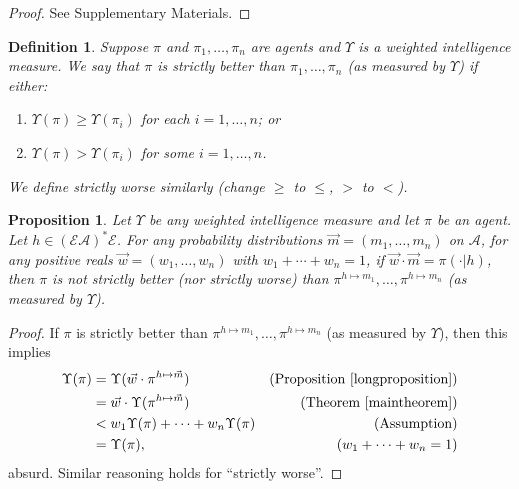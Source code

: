 \documentclass[twoside]{article}
\newtheorem{definition}[theorem]{Definition}
\newtheorem{proposition}[theorem]{Proposition}
\begin{document}
\begin{proof}
    See Supplementary Materials.
\end{proof}

\begin{definition}
    Suppose $\pi$ and $\pi_1,\ldots,\pi_n$ are agents and $\Upsilon$ is a
    weighted intelligence measure. We say that $\pi$ is \emph{strictly better than}
    $\pi_1,\ldots,\pi_n$ (as measured by $\Upsilon$) if either:
    \begin{enumerate}
        \item $\Upsilon(\pi)\geq \Upsilon(\pi_i)$ for each $i=1,\ldots,n$; or
        \item $\Upsilon(\pi)>\Upsilon(\pi_i)$ for some $i=1,\ldots,n$.
    \end{enumerate}
    We define \emph{strictly worse} similarly (change $\geq$ to $\leq$,
    $>$ to $<$).
\end{definition}

\begin{proposition}
\label{pointwisegenericnessthm}
    Let $\Upsilon$ be any weighted intelligence measure and let
    $\pi$ be an agent.
    Let $h\in (\mathcal E\mathcal A)^*\mathcal E$.
    For any probability distributions $\vec m=(m_1,\ldots,m_n)$ on $\mathcal A$,
    for any positive reals $\vec w=(w_1,\ldots,w_n)$ with $w_1+\cdots+w_n=1$,
    if $\vec w\cdot\vec m=\pi(\cdot|h)$,
    then $\pi$ is not strictly better (nor strictly worse) than
    $\pi^{h\mapsto m_1},\ldots,\pi^{h\mapsto m_n}$
    (as measured by $\Upsilon$).
\end{proposition}

\begin{proof}
    If $\pi$ is strictly better than $\pi^{h\mapsto m_1},\ldots,\pi^{h\mapsto m_n}$
    (as measured by $\Upsilon$), then this implies
    \begin{align*}
        \Upsilon(\pi)
            &= \Upsilon(\vec w\cdot\pi^{h\mapsto\vec m})
                &\mbox{(Proposition \ref{longproposition})}\\
            &= \vec w\cdot\Upsilon(\pi^{h\mapsto\vec m})
                &\mbox{(Theorem \ref{maintheorem})}\\
            &< w_1\Upsilon(\pi)+\cdots+w_n\Upsilon(\pi)
                &\mbox{(Assumption)}\\
            &= \Upsilon(\pi),
                &\mbox{($w_1+\cdots+w_n=1$)}
    \end{align*}
    absurd. Similar reasoning holds for ``strictly worse''.
\end{proof}
\end{document}
